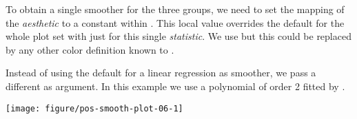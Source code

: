 \documentclass[krantz2]{krantz}\usepackage{knitr}%
\begin{document}
To obtain a single smoother for the three groups, we need to set the mapping of the  \emph{aesthetic} to a constant within . This local value overrides the default for the whole plot set with  just for this single \emph{statistic}. We use  but this could be replaced by any other color definition known to \Rlang.

\begin{knitrout}\footnotesize
{}\color{fgcolor}\begin{kframe}
\begin{alltt}
\hlstd{(}  \hlstd{(}     \hlstd{=}  \hlopt{+}
  \hlstd{(} \hlstd{=} \hlstd{,}  \hlstd{=} \hlstd{)} \hlopt{+}
  \hlstd{()}
\end{alltt}
\end{kframe}
\end{knitrout}

Instead of using the default  for a linear regression as smoother, we pass a different  as argument. In this example we use a polynomial of order 2 fitted by .

\begin{knitrout}\footnotesize
{}\color{fgcolor}\begin{kframe}
\begin{alltt}
\hlstd{(}  \hlstd{(}     \hlstd{=}  \hlopt{+}
  \hlstd{(} \hlstd{=} \hlstd{,}   \hlopt{~}  \hlstd{),}  \hlstd{=} \hlstd{)} \hlopt{+}
  \hlstd{()}
\end{alltt}
\end{kframe}

{\centering \texttt{[image: figure/pos-smooth-plot-06-1]} 

}



\end{knitrout}
\end{document}

